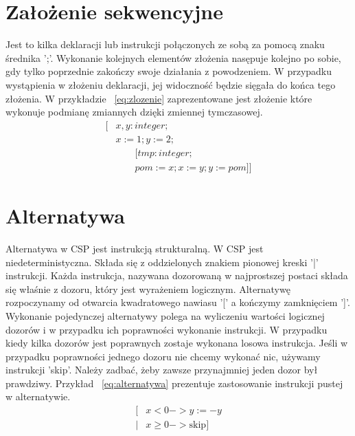 \documentclass[a4paper]{report}
\begin{document}
  \section{Założenie sekwencyjne}
  Jest to kilka deklaracji lub instrukcji połączonych ze sobą za pomocą znaku średnika ';'.
  Wykonanie kolejnych elementów złożenia nasępuje kolejno po sobie, gdy tylko poprzednie zakończy swoje działania z powodzeniem.
  W przypadku wystąpienia w złożeniu deklaracji, jej widoczność będzie sięgała do końca tego złożenia.
  W przykładzie ~\ref{eq:zlozenie} zaprezentowane jest złożenie które wykonuje podmianę zmiannych dzięki zmiennej tymczasowej.
  \begin{equation}
    \label{eq:zlozenie}
    \begin{split}
      \lbrack & x, y: integer;\\
      & x := 1; y := 2;\\
      & \qquad \lbrack tmp: integer;\\
      & \qquad pom := x; x := y; y := pom \rbrack \rbrack
    \end{split}
  \end{equation}

  \section{Alternatywa}
  Alternatywa w CSP jest instrukcją strukturalną.
  W CSP jest niedeterministyczna.
  Składa się z oddzielonych znakiem pionowej kreski '|' instrukcji.
  Każda instrukcja, nazywana dozorowaną w najprostszej postaci składa się właśnie z dozoru, który jest wyrażeniem logicznym.
  Alternatywę rozpoczynamy od otwarcia kwadratowego nawiasu '[' a kończymy zamknięciem ']'.
  Wykonanie pojedynczej alternatywy polega na wyliczeniu wartości logicznej dozorów i w przypadku ich poprawności wykonanie instrukcji.
  W przypadku kiedy kilka dozorów jest poprawnych zostaje wykonana losowa instrukcja.
  Jeśli w przypadku poprawności jednego dozoru nie chcemy wykonać nic, używamy instrukcji 'skip'.
  Należy zadbać, żeby zawsze przynajmniej jeden dozor był prawdziwy.
  Przykład ~\ref{eq:alternatywa} prezentuje zastosowanie instrukcji pustej w alternatywie.
  \begin{equation}
    \label{eq:alternatywa}
    \begin{split}
      \lbrack & x < 0 -> y := -y \\
      | & x \geq0 -> \text{skip} \rbrack
    \end{split}
  \end{equation}
\end{document}
